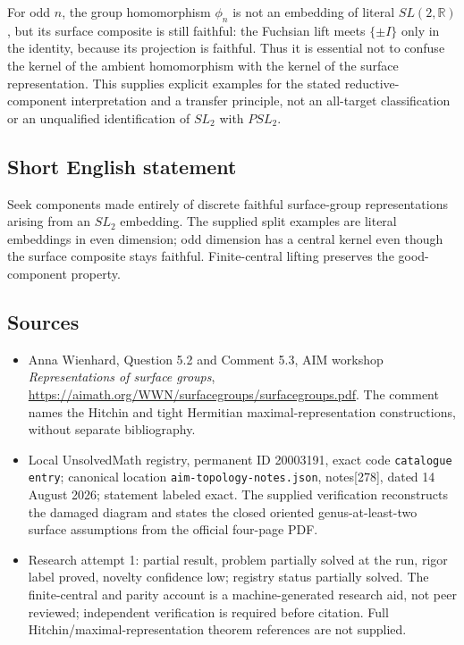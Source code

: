 \documentclass[11pt]{article}
\newcommand{\R}{\mathbb{R}}
\begin{document}
For odd \(n\), the group homomorphism \(\phi_n\) is not an embedding of literal \(SL(2,\R)\), but its surface composite is still faithful: the Fuchsian lift meets \(\{\pm I\}\) only in the identity, because its projection is faithful. Thus it is essential not to confuse the kernel of the ambient homomorphism with the kernel of the surface representation. This supplies explicit examples for the stated reductive-component interpretation and a transfer principle, not an all-target classification or an unqualified identification of \(SL_2\) with \(PSL_2\).
\subsection{Short English statement}
Seek components made entirely of discrete faithful surface-group representations arising from an \(SL_2\) embedding. The supplied split examples are literal embeddings in even dimension; odd dimension has a central kernel even though the surface composite stays faithful. Finite-central lifting preserves the good-component property.
\subsection{Sources}
\begin{itemize}
\item Anna Wienhard, Question 5.2 and Comment 5.3, AIM workshop \emph{Representations of surface groups}, \url{https://aimath.org/WWN/surfacegroups/surfacegroups.pdf}. The comment names the Hitchin and tight Hermitian maximal-representation constructions, without separate bibliography.
\item Local UnsolvedMath registry, permanent ID 20003191, exact code \texttt{catalogue entry}; canonical location \texttt{aim-topology-notes.json}, notes[278], dated 14 August 2026; statement labeled exact. The supplied verification reconstructs the damaged diagram and states the closed oriented genus-at-least-two surface assumptions from the official four-page PDF.
\item Research attempt 1: partial result, problem partially solved at the run, rigor label proved, novelty confidence low; registry status partially solved. The finite-central and parity account is a machine-generated research aid, not peer reviewed; independent verification is required before citation. Full Hitchin/maximal-representation theorem references are not supplied.
\end{itemize}
\end{document}
